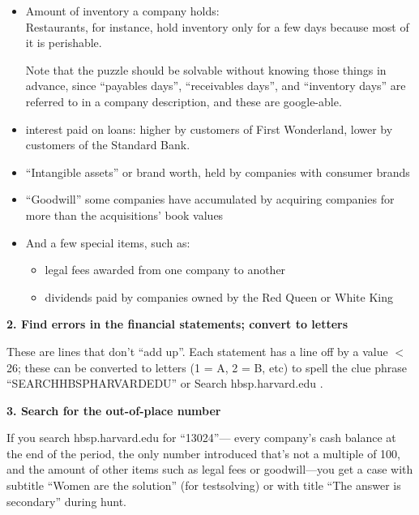 \documentclass[10pt]{article}
\begin{document}
{{\begin{itemize}
\item Amount of inventory a company holds:\\
Restaurants, for instance, hold inventory only for a few days because most of it is perishable.

Note that the puzzle should be solvable without knowing those things
in advance, since ``payables days'', ``receivables days'', and
``inventory days'' are referred to in a company description, and these
are google-able.

\item interest paid on loans: higher by customers of First Wonderland, lower by customers of the Standard Bank.

\item ``Intangible assets'' or brand worth, held by companies with consumer brands

\item ``Goodwill'' some companies have accumulated by acquiring companies for more than the acquisitions' book values

\item And a few special items, such as:

\begin{itemize}
\vspace{-.1in}
\item legal fees awarded from one company to another

\item dividends paid by companies owned by the Red Queen or White King

\end{itemize}

\end{itemize}
\vspace{-.1in}

\vspace{.1in}
\textbf{\large 2. Find errors in the financial statements; convert to letters}

These are lines that don't ``add up''.  Each statement has a line off
by a value $<$ 26; these can be converted to letters (1 = A, 2 = B, etc) to
spell the clue phrase ``SEARCHHBSPHARVARDEDU'' or Search
hbsp.harvard.edu .

\vspace{.1in}
\textbf{\large 3. Search for the out-of-place number}

If you search hbsp.harvard.edu for ``13024''--- every company's
cash balance at the end of the period, the only number introduced
that's not a multiple of 100, and the amount of other items such as
legal fees or goodwill---you get a case with subtitle ``Women are the
solution'' (for testsolving) or with title ``The answer is secondary''
during hunt.

}}{}
\end{document}
